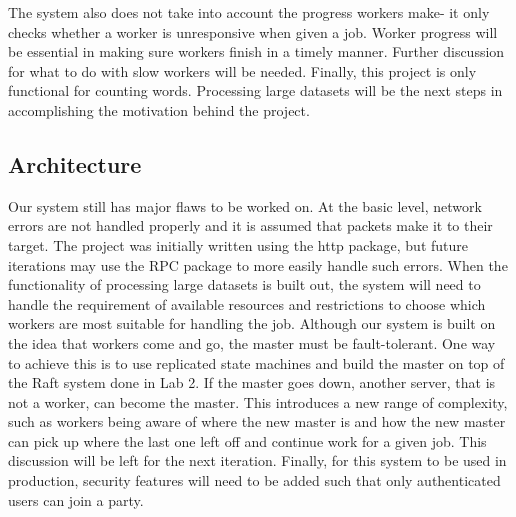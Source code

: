 \documentclass[twoside]{article}
\begin{document}
The system also does not take into account the progress workers make- it only checks whether a worker is unresponsive when given a job. Worker progress will be essential in making sure workers finish in a timely manner. Further discussion for what to do with slow workers will be needed.
Finally, this project is only functional for counting words. Processing large datasets will be the next steps in accomplishing the motivation behind the project. 

\subsection{Architecture}
Our system still has major flaws to be worked on. At the basic level, network errors are not handled properly and it is assumed that packets make it to their target. The project was initially written using the http package, but future iterations may use the RPC package to more easily handle such errors. When the functionality of processing large datasets is built out, the system will need to handle the requirement of available resources and restrictions to choose which workers are most suitable for handling the job. Although our
system is built on the idea that workers come and go, the master must be fault-tolerant. One way to achieve this is to use replicated state machines and build the master on top of the Raft system done in Lab 2. If the master goes down, another server, that is not a worker, can become the master. This introduces a new range of complexity, such as workers being aware of where the new master is and how the new master can pick up where the last one left off and continue work for a given job. This
discussion will be left for the next iteration. Finally, for this system to be used in production, security features will need to be added such that only authenticated users can join a party. 



\end{document}
